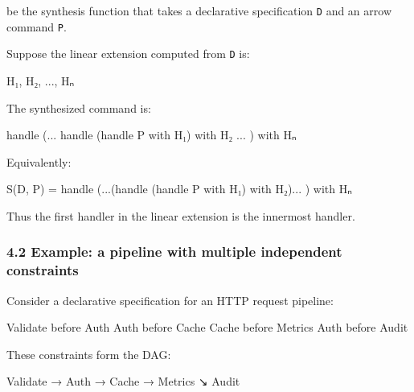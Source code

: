 \documentclass[
  11pt,
]{article}
\newenvironment{Shaded}{}{}
\newcommand{\NormalTok}[1]{#1}
\begin{document}
be the synthesis function that takes a declarative specification
\texttt{D} and an arrow command \texttt{P}.

Suppose the linear extension computed from \texttt{D} is:

\begin{Shaded}
\begin{Highlighting}[]
\NormalTok{H₁, H₂, ..., Hₙ}
\end{Highlighting}
\end{Shaded}

The synthesized command is:

\begin{Shaded}
\begin{Highlighting}[]
\NormalTok{handle (... handle (handle P with H₁) with H₂ ... ) with Hₙ}
\end{Highlighting}
\end{Shaded}

Equivalently:

\begin{Shaded}
\begin{Highlighting}[]
\NormalTok{S(D, P) =}
\NormalTok{  handle (...(handle (handle P with H₁) with H₂)... ) with Hₙ}
\end{Highlighting}
\end{Shaded}

Thus the first handler in the linear extension is the innermost handler.

\subsubsection{4.2 Example: a pipeline with multiple independent
constraints}\label{example-a-pipeline-with-multiple-independent-constraints}

Consider a declarative specification for an HTTP request pipeline:

\begin{Shaded}
\begin{Highlighting}[]
\NormalTok{Validate before Auth}
\NormalTok{Auth before Cache}
\NormalTok{Cache before Metrics}
\NormalTok{Auth before Audit}
\end{Highlighting}
\end{Shaded}

These constraints form the DAG:

\begin{Shaded}
\begin{Highlighting}[]
\NormalTok{Validate → Auth → Cache → Metrics}
\NormalTok{              ↘}
\NormalTok{                Audit}
\end{Highlighting}
\end{Shaded}
\end{document}
